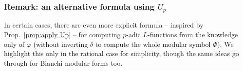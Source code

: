 \documentclass[a4paper,11pt]{article}
\numberwithin{equation}{section}
\begin{document}
\begin{comment}
To prove the second claim, the definition clearly makes $\Phi$ to be linear on $\Div^0(\mathbb{P}^1(\Q))$, so it is enough to check $\Gamma$-equivariance. This follows from the following calculation:
\begin{align*}
\Phi\{g\gamma_jc_j\rightarrow g\gamma_ic_i\}&=\varphi(g\gamma_j)-\varphi(g\gamma_i) = 
g\gamma_j\varphi(\gamma_j^{-1}g^{-1}) - g\gamma_i\varphi(\gamma_i^{-1}g^{-1})\\
&=\left(g\gamma_j\varphi(\gamma_j^{-1}) + g\varphi(g^{-1})\right) -\left(g\gamma_i\varphi(\gamma_i^{-1}) + g\varphi(g^{-1})\right)\\
&= g\left(\gamma_j\varphi(\gamma_j^{-1}) - \gamma_i\varphi(\gamma_i^{-1})\right)\\
&=g\Phi\{\gamma_jc_j\rightarrow \gamma_ic_i\}.
\end{align*}

The third claim is obvious: since $\infty=c_1$, we have
\[
(\delta\Phi)(\gamma)=\Phi\{\infty\rightarrow\gamma\infty\} = \varphi(1)-\gamma\varphi(\gamma^{-1})-\varphi(1)=\varphi(\gamma).
\]
\end{proof}

The modular symbol thus defined is not an eigensymbol, in general. Since $\delta$ is Hecke-equivariant, we have:
\[
\delta(T(f) - f) = 0,
\]
and so $T(f) = f + \epsilon$, where $\epsilon$ is an Eistenstein symbol. In order to obtain an eigensymbol it suffices to apply for example $T_\ell-\ell-1$ for any prime $\ell$.
      
\end{comment}


\subsubsection{Remark: an alternative formula using $U_p$}
In certain cases, there are even more explicit formula -- inspired by Prop.~\ref{prop:apply Up} -- for computing $p$-adic $L$-functions from the knowledge only of $\varphi$ (without inverting $\delta$ to compute the whole modular symbol $\Phi$). We highlight this only in the rational case for simplicity, though the same ideas go through for Bianchi modular forms too.
\end{document}
